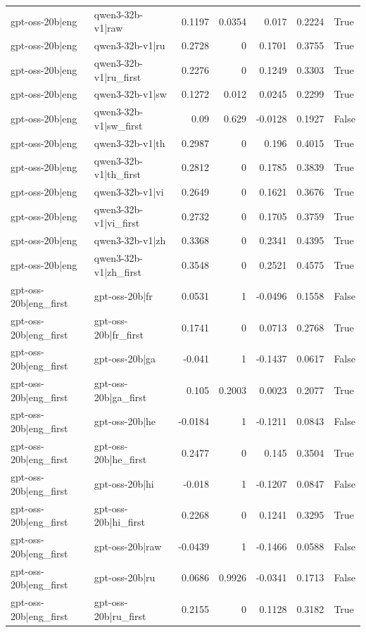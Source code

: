 \begin{table}
\begin{tabular}{l l r r r r l}
gpt-oss-20b|eng & qwen3-32b-v1|raw & 0.1197 & 0.0354 & 0.017 & 0.2224 & True \\
gpt-oss-20b|eng & qwen3-32b-v1|ru & 0.2728 & 0 & 0.1701 & 0.3755 & True \\
gpt-oss-20b|eng & qwen3-32b-v1|ru_first & 0.2276 & 0 & 0.1249 & 0.3303 & True \\
gpt-oss-20b|eng & qwen3-32b-v1|sw & 0.1272 & 0.012 & 0.0245 & 0.2299 & True \\
gpt-oss-20b|eng & qwen3-32b-v1|sw_first & 0.09 & 0.629 & -0.0128 & 0.1927 & False \\
gpt-oss-20b|eng & qwen3-32b-v1|th & 0.2987 & 0 & 0.196 & 0.4015 & True \\
gpt-oss-20b|eng & qwen3-32b-v1|th_first & 0.2812 & 0 & 0.1785 & 0.3839 & True \\
gpt-oss-20b|eng & qwen3-32b-v1|vi & 0.2649 & 0 & 0.1621 & 0.3676 & True \\
gpt-oss-20b|eng & qwen3-32b-v1|vi_first & 0.2732 & 0 & 0.1705 & 0.3759 & True \\
gpt-oss-20b|eng & qwen3-32b-v1|zh & 0.3368 & 0 & 0.2341 & 0.4395 & True \\
gpt-oss-20b|eng & qwen3-32b-v1|zh_first & 0.3548 & 0 & 0.2521 & 0.4575 & True \\
gpt-oss-20b|eng_first & gpt-oss-20b|fr & 0.0531 & 1 & -0.0496 & 0.1558 & False \\
gpt-oss-20b|eng_first & gpt-oss-20b|fr_first & 0.1741 & 0 & 0.0713 & 0.2768 & True \\
gpt-oss-20b|eng_first & gpt-oss-20b|ga & -0.041 & 1 & -0.1437 & 0.0617 & False \\
gpt-oss-20b|eng_first & gpt-oss-20b|ga_first & 0.105 & 0.2003 & 0.0023 & 0.2077 & True \\
gpt-oss-20b|eng_first & gpt-oss-20b|he & -0.0184 & 1 & -0.1211 & 0.0843 & False \\
gpt-oss-20b|eng_first & gpt-oss-20b|he_first & 0.2477 & 0 & 0.145 & 0.3504 & True \\
gpt-oss-20b|eng_first & gpt-oss-20b|hi & -0.018 & 1 & -0.1207 & 0.0847 & False \\
gpt-oss-20b|eng_first & gpt-oss-20b|hi_first & 0.2268 & 0 & 0.1241 & 0.3295 & True \\
gpt-oss-20b|eng_first & gpt-oss-20b|raw & -0.0439 & 1 & -0.1466 & 0.0588 & False \\
gpt-oss-20b|eng_first & gpt-oss-20b|ru & 0.0686 & 0.9926 & -0.0341 & 0.1713 & False \\
gpt-oss-20b|eng_first & gpt-oss-20b|ru_first & 0.2155 & 0 & 0.1128 & 0.3182 & True \\

\end{tabular}
\end{table}

